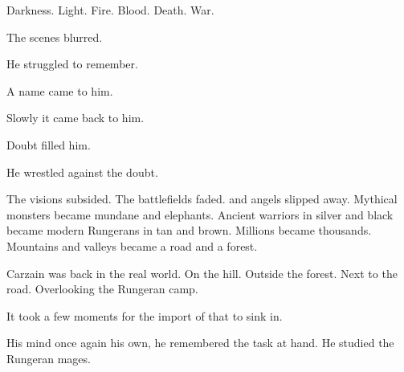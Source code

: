 Darkness. 
Light. 
Fire. 
Blood. 
Death. 
War. 


The scenes blurred. 


He struggled to remember. 


A name came to him. 



Slowly it came back to him. 



Doubt filled him. 


He wrestled against the doubt. 


The visions subsided. 
The battlefields faded. 
\Dragons{} and angels slipped away. 
Mythical monsters became mundane \mulgrons{} and elephants. 
Ancient warriors in silver and black became modern Rungerans in tan and brown. 
Millions became thousands. 
Mountains and valleys became a road and a forest. 

Carzain was back in the real world. 
On the hill. 
Outside the forest. 
Next to the road. 
Overlooking the Rungeran camp. 


It took a few moments for the import of that to sink in. 


His mind once again his own, he remembered the task at hand. 
He studied the Rungeran mages. 

